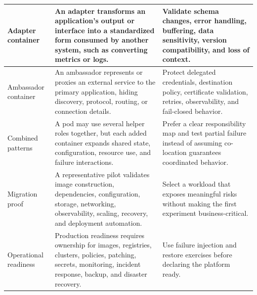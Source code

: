 \documentclass[11pt]{article}
\begin{document}
\begin{longtable}{@{}>{\RaggedRight\arraybackslash}p{}>{\RaggedRight\arraybackslash}p{}>{\RaggedRight\arraybackslash}p{}@{}}
Adapter container & An adapter transforms an application's output or interface into a standardized form consumed by another system, such as converting metrics or logs. & Validate schema changes, error handling, buffering, data sensitivity, version compatibility, and loss of context. \\\midrule
Ambassador container & An ambassador represents or proxies an external service to the primary application, hiding discovery, protocol, routing, or connection details. & Protect delegated credentials, destination policy, certificate validation, retries, observability, and fail-closed behavior. \\\midrule
Combined patterns & A pod may use several helper roles together, but each added container expands shared state, configuration, resource use, and failure interactions. & Prefer a clear responsibility map and test partial failure instead of assuming co-location guarantees coordinated behavior. \\\midrule
Migration proof & A representative pilot validates image construction, dependencies, configuration, storage, networking, observability, scaling, recovery, and deployment automation. & Select a workload that exposes meaningful risks without making the first experiment business-critical. \\\midrule
Operational readiness & Production readiness requires ownership for images, registries, clusters, policies, patching, secrets, monitoring, incident response, backup, and disaster recovery. & Use failure injection and restore exercises before declaring the platform ready. \\\midrule
\bottomrule
\end{longtable}
\endgroup
\end{document}
